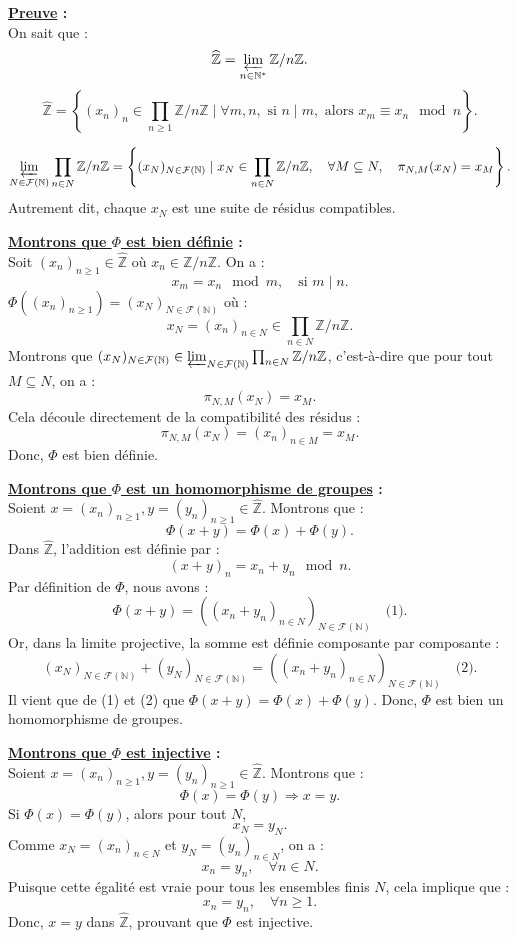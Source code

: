 \documentclass[a4paper, 14pt]{report}
\newcommand{\divides}{\mid}
\begin{document}
\begin{onehalfspace}
{\textbf{\underline{Preuve} :}\\
On sait que :
\[
\widehat{\mathbb{Z}} = \varprojlim_{n \in \mathbb{N}^*} \mathbb{Z}/n\mathbb{Z}.
\]
\[
\widehat{\mathbb{Z}} = \left\{ (x_n)_n \in \prod_{n \geq 1} \mathbb{Z}/n\mathbb{Z} \mid \forall m, n, \text{ si } n \mid m, \text{ alors } x_m \equiv x_n \mod n \right\}.
\]


\[
\varprojlim_{N \in \mathcal{F}(\mathbb{N})} \prod_{n \in N} \mathbb{Z}/n\mathbb{Z} = \left\{ (x_N)_{N \in \mathcal{F}(\mathbb{N})} \mid x_N \in \prod_{n \in N} \mathbb{Z}/n\mathbb{Z}, \quad \forall M \subseteq N, \quad \pi_{N,M}(x_N) = x_M \right\}.
\]
Autrement dit, chaque $x_N$ est une suite de résidus compatibles.

\textbf{\underline{ Montrons que $\Phi$ est bien définie} :}\\
Soit $(x_n)_{n \geq 1} \in \widehat{\mathbb{Z}}$  où $x_n \in \mathbb{Z}/n\mathbb{Z}$. On a :
\[
x_m = x_n \mod m, \quad \text{si } m \divides n.
\]
$\Phi ((x_n)_{n \geq 1}) = (x_N)_{N \in \mathcal{F}(\mathbb{N})}$  où :
\[
x_N = (x_n)_{n \in N} \in \prod_{n \in N} \mathbb{Z}/n\mathbb{Z}.
\]
Montrons que $(x_N)_{N \in \mathcal{F}(\mathbb{N})} \in \varprojlim_{N \in \mathcal{F}(\mathbb{N})} \prod_{n \in N} \mathbb{Z}/n\mathbb{Z}$, c'est-à-dire que pour tout $M \subseteq N$, on a :
\[
\pi_{N,M}(x_N) = x_M.
\]
Cela découle directement de la compatibilité des résidus :
\[
\pi_{N,M}(x_N) = (x_n)_{n \in M} = x_M.
\]
Donc, $\Phi$ est bien définie.

\textbf{\underline{Montrons que $\Phi$ est un homomorphisme de groupes} :}\\
Soient $x=(x_n)_{n \geq 1}, y=(y_n)_{n \geq 1} \in \widehat{\mathbb{Z}}$. Montrons que :
\[
\Phi(x + y) = \Phi(x) + \Phi(y).
\]
Dans $\widehat{\mathbb{Z}}$, l’addition est définie par :
\[
(x + y)_n = x_n + y_n \mod n.
\]
Par définition de $\Phi$, nous avons :
\[
\Phi(x + y) = ( (x_n + y_n)_{n \in N} )_{N \in \mathcal{F}(\mathbb{N})} \quad \text{(1)}.
\]
Or, dans la limite projective, la somme est définie composante par composante :
\[
(x_N)_{N \in \mathcal{F}(\mathbb{N})} + (y_N)_{N \in \mathcal{F}(\mathbb{N})} = ( (x_n + y_n)_{n \in N} )_{N \in \mathcal{F}(\mathbb{N})} \quad \text{(2)}.
\]	
Il vient que de (1) et (2) que \(	\Phi(x + y) = \Phi(x) + \Phi(y) \). Donc, $\Phi$ est bien un homomorphisme de groupes.

\textbf{\underline{Montrons que $\Phi$ est injective} :}\\
Soient $x=(x_n)_{n \geq 1}, y=(y_n)_{n \geq 1} \in \widehat{\mathbb{Z}}$.
Montrons que :
\[
\Phi(x) = \Phi(y) \Rightarrow x = y.
\]
Si $\Phi(x) = \Phi(y)$, alors pour tout $N$,
\[
x_N = y_N.
\]
Comme $x_N = (x_n)_{n \in N}$ et $y_N = (y_n)_{n \in N}$, on a :
\[
x_n = y_n, \quad \forall n \in N.
\]
Puisque cette égalité est vraie pour tous les ensembles finis $N$, cela implique que :
\[
x_n = y_n, \quad \forall n \geq 1.
\]
Donc, $x = y$ dans $\widehat{\mathbb{Z}}$, prouvant que $\Phi$ est injective.

}
\end{onehalfspace}
\end{document}
